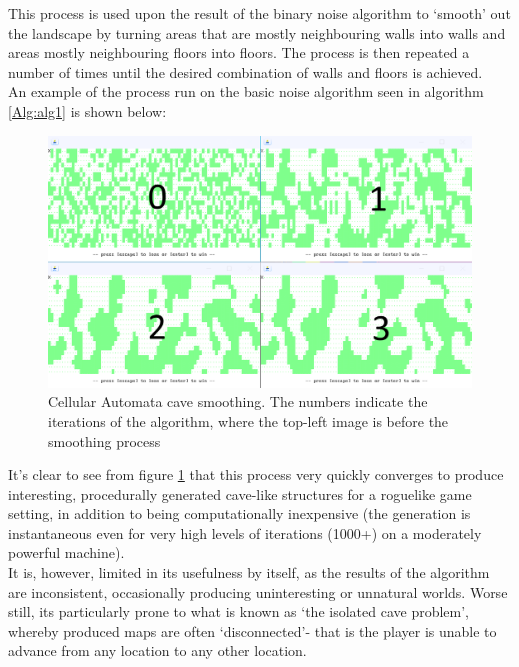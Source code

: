 \documentclass[12pt,a4paper]{article}
\begin{document}
This process is used upon the result of the binary noise algorithm to `smooth' out the landscape by turning areas that are mostly neighbouring walls into walls and areas mostly neighbouring floors into floors. The process is then repeated a number of times until the desired combination of walls and floors is achieved. \\

An example of the process run on the basic noise algorithm seen in algorithm \ref{Alg:alg1} is shown below:

\begin{figure}[h]
  \centering
 	\includegraphics[scale=0.5]{images/cellauto.png}
	\caption[]{Cellular Automata cave smoothing. The numbers indicate the iterations of the algorithm, where the top-left image is before the smoothing process}
	\label{fig:fig3}
\end{figure}

It's clear to see from figure \ref{fig:fig3} that this process very quickly converges to produce interesting, procedurally generated cave-like structures for a roguelike game setting, in addition to being computationally inexpensive (the generation is instantaneous even for very high levels of iterations (1000+) on a moderately powerful machine). \\

It is, however, limited in its usefulness by itself, as the results of the algorithm are inconsistent, occasionally producing uninteresting or unnatural worlds. Worse still, its particularly prone to what is known as `the isolated cave problem', whereby produced maps are often `disconnected'- that is the player is unable to advance from any location to any other location. \\
\end{document}
